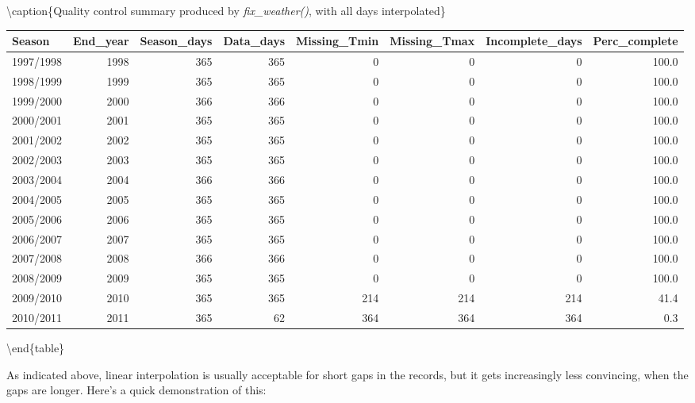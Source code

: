 \documentclass[
]{book}
\begin{document}
\textbackslash caption\{\label{tab:unnamed-chunk-8}Quality control summary produced by \emph{fix\_weather()}, with all days interpolated\}
\fontsize{10}{12}\selectfont

\begin{tabular}[t]{l|r|r|r|r|r|r|r}
\hline
Season & End\_year & Season\_days & Data\_days & Missing\_Tmin & Missing\_Tmax & Incomplete\_days & Perc\_complete\\
\hline
1997/1998 & 1998 & 365 & 365 & 0 & 0 & 0 & 100.0\\
\hline
1998/1999 & 1999 & 365 & 365 & 0 & 0 & 0 & 100.0\\
\hline
1999/2000 & 2000 & 366 & 366 & 0 & 0 & 0 & 100.0\\
\hline
2000/2001 & 2001 & 365 & 365 & 0 & 0 & 0 & 100.0\\
\hline
2001/2002 & 2002 & 365 & 365 & 0 & 0 & 0 & 100.0\\
\hline
2002/2003 & 2003 & 365 & 365 & 0 & 0 & 0 & 100.0\\
\hline
2003/2004 & 2004 & 366 & 366 & 0 & 0 & 0 & 100.0\\
\hline
2004/2005 & 2005 & 365 & 365 & 0 & 0 & 0 & 100.0\\
\hline
2005/2006 & 2006 & 365 & 365 & 0 & 0 & 0 & 100.0\\
\hline
2006/2007 & 2007 & 365 & 365 & 0 & 0 & 0 & 100.0\\
\hline
2007/2008 & 2008 & 366 & 366 & 0 & 0 & 0 & 100.0\\
\hline
2008/2009 & 2009 & 365 & 365 & 0 & 0 & 0 & 100.0\\
\hline
2009/2010 & 2010 & 365 & 365 & 214 & 214 & 214 & 41.4\\
\hline
2010/2011 & 2011 & 365 & 62 & 364 & 364 & 364 & 0.3\\
\hline
\end{tabular}

\textbackslash end\{table\}

As indicated above, linear interpolation is usually acceptable for short gaps in the records, but it gets increasingly less convincing, when the gaps are longer. Here's a quick demonstration of this:
\end{document}
